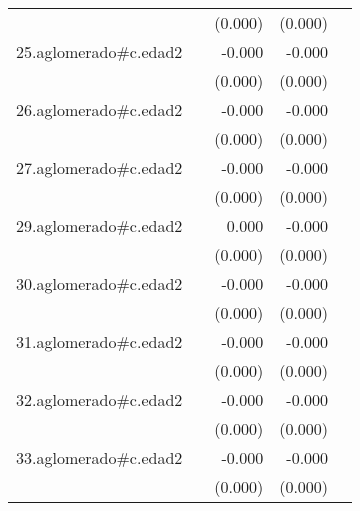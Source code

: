 {\begin{longtable}{l*{4}{D{.}{.}{-1}}}
            &                     &     (0.000)         &     (0.000)         &                     \\
\addlinespace
25.aglomerado#c.edad2&                     &      -0.000         &      -0.000         &                     \\
            &                     &     (0.000)         &     (0.000)         &                     \\
\addlinespace
26.aglomerado#c.edad2&                     &      -0.000         &      -0.000         &                     \\
            &                     &     (0.000)         &     (0.000)         &                     \\
\addlinespace
27.aglomerado#c.edad2&                     &      -0.000         &      -0.000\sym{**} &                     \\
            &                     &     (0.000)         &     (0.000)         &                     \\
\addlinespace
29.aglomerado#c.edad2&                     &       0.000         &      -0.000         &                     \\
            &                     &     (0.000)         &     (0.000)         &                     \\
\addlinespace
30.aglomerado#c.edad2&                     &      -0.000         &      -0.000\sym{**} &                     \\
            &                     &     (0.000)         &     (0.000)         &                     \\
\addlinespace
31.aglomerado#c.edad2&                     &      -0.000         &      -0.000\sym{*}  &                     \\
            &                     &     (0.000)         &     (0.000)         &                     \\
\addlinespace
32.aglomerado#c.edad2&                     &      -0.000\sym{**} &      -0.000\sym{***}&                     \\
            &                     &     (0.000)         &     (0.000)         &                     \\
\addlinespace
33.aglomerado#c.edad2&                     &      -0.000         &      -0.000\sym{***}&                     \\
            &                     &     (0.000)         &     (0.000)         &                     \\

\end{longtable}}
